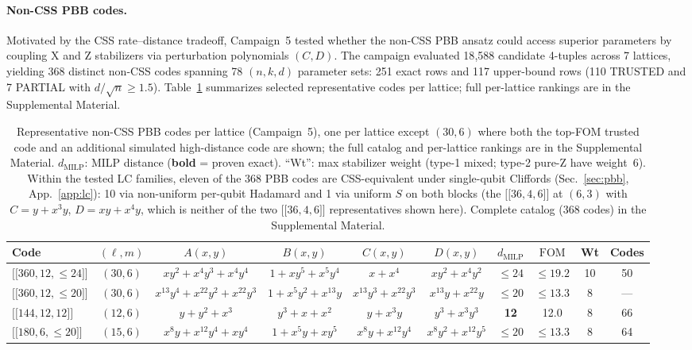 \documentclass[aps,prxquantum,twocolumn,superscriptaddress,nofootinbib]{revtex4-2}
\newcommand{\dblbrk}[1]{\ensuremath{\lbrack\!\lbrack #1 \rbrack\!\rbrack}}
\newcommand{\code}[1]{\dblbrk{#1}}
\newcommand{\FOM}{\ensuremath{\mathrm{FOM}}}
\begin{document}
\paragraph{Non-CSS PBB codes.}
Motivated by the CSS rate--distance tradeoff, Campaign~5 tested whether the non-CSS PBB ansatz could access superior parameters by coupling X and Z stabilizers via perturbation polynomials $(C, D)$. 
The campaign evaluated 18{,}588 candidate 4-tuples across 7 lattices, yielding 368 distinct non-CSS codes spanning 78 $(n,k,d)$ parameter sets: 251 exact rows and 117 upper-bound rows (110 TRUSTED and 7 PARTIAL with $d/\sqrt{n} \geq 1.5$).
Table~\ref{tab:pbb_best} summarizes selected representative codes per lattice; full per-lattice rankings are in the Supplemental Material.

\begin{table}[t]
\centering
\caption{Representative non-CSS PBB codes per lattice (Campaign~5), one per lattice except $(30,6)$ where both the top-FOM trusted code and an additional simulated high-distance code are shown; the full catalog and per-lattice rankings are in the Supplemental Material.
$d_{\text{MILP}}$: MILP distance (\textbf{bold} = proven exact).
``Wt'': max stabilizer weight (type-1 mixed; type-2 pure-Z have weight~6).
Within the tested LC families, eleven of the 368 PBB codes are CSS-equivalent under single-qubit Cliffords (Sec.~\ref{sec:pbb}, App.~\ref{app:lc}): 10 via non-uniform per-qubit Hadamard and 1 via uniform $S$ on both blocks (the $\code{36,4,6}$ at $(6,3)$ with $C = y{+}x^3 y$, $D = xy{+}x^4 y$, which is neither of the two $\code{36,4,6}$ representatives shown here).
Complete catalog (368 codes) in the Supplemental Material.}
\label{tab:pbb_best}
\scriptsize
\begin{tabular}{lccccccccc}
\toprule
Code & $(\ell,m)$ & $A(x,y)$ & $B(x,y)$ & $C(x,y)$ & $D(x,y)$ & $d_{\text{MILP}}$ & $\FOM$ & Wt & Codes \\
\midrule
$\code{360,12,{\leq}24}$ & $(30,6)$ & $xy^2{+}x^4 y^3{+}x^4 y^4$ & $1{+}xy^5{+}x^5 y^4$ & $x{+}x^4$ & $xy^2{+}x^4 y^2$ & $\leq 24$ & $\leq 19.2$ & 10 & 50 \\
$\code{360,12,{\leq}20}$ & $(30,6)$ & $x^{13}y^4{+}x^{22}y^2{+}x^{22}y^3$ & $1{+}x^5 y^2{+}x^{13}y$ & $x^{13}y^3{+}x^{22}y^3$ & $x^{13}y{+}x^{22}y$ & $\leq 20$ & $\leq 13.3$ & 8 & --- \\
$\code{144,12,12}$ & $(12,6)$ & $y{+}y^2{+}x^3$ & $y^3{+}x{+}x^2$ & $y{+}x^3 y$ & $y^3{+}x^3 y^3$ & \textbf{12} & 12.0 & 8 & 66 \\
$\code{180,6,{\leq}20}$ & $(15,6)$ & $x^8 y{+}x^{12}y^4{+}xy^4$ & $1{+}x^5 y{+}xy^5$ & $x^8 y{+}x^{12}y^4$ & $x^8 y^2{+}x^{12}y^5$ & $\leq 20$ & $\leq 13.3$ & 8 & 64 \\

\end{tabular}
\end{table}
\end{document}
